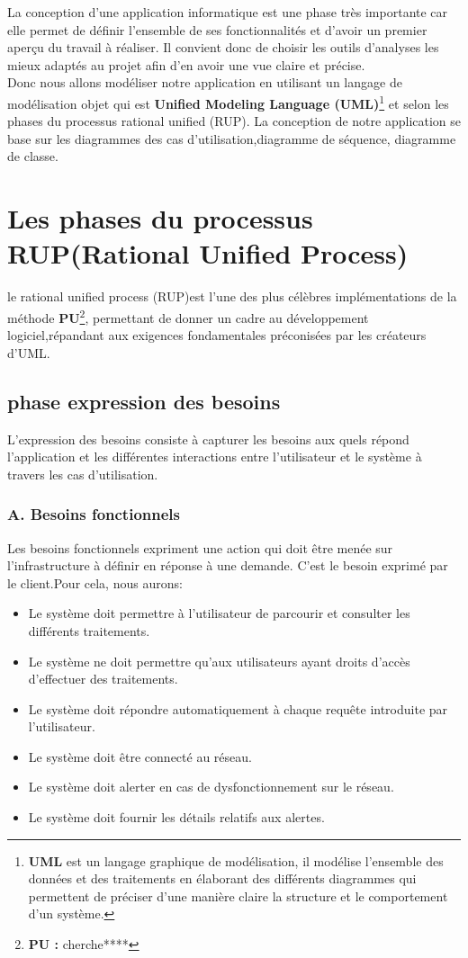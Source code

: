 
La conception d'une application informatique est une phase très importante car elle permet de définir l'ensemble de ses fonctionnalités et d'avoir un premier aperçu du travail à réaliser. Il convient donc de choisir les outils d'analyses les mieux adaptés au projet afin d'en avoir une vue claire et précise.\\
Donc  nous allons modéliser notre application en utilisant un langage de modélisation objet qui est \textbf{Unified Modeling Language (UML)}\footnote{\textbf{UML} est un langage graphique de modélisation, il modélise l'ensemble des données et des traitements en élaborant des différents diagrammes qui permettent de préciser d'une manière claire la structure et le comportement d'un système.} et selon les phases du processus rational unified (RUP).
La conception de notre application se base sur les diagrammes  des cas d'utilisation,diagramme de séquence, diagramme de classe.\\
\section{Les phases du processus RUP(Rational Unified Process)}
le rational unified process (RUP)est l'une des plus célèbres implémentations de la méthode \textbf{PU}\footnote{\textbf{PU :} cherche****}, permettant de donner un cadre au développement logiciel,répandant aux exigences fondamentales préconisées par les créateurs d'UML. 
\subsection{phase expression des besoins}
L'expression des besoins consiste à capturer les besoins aux quels  répond  l'application et les différentes interactions entre l'utilisateur et le système à travers les cas d'utilisation.

\subsubsection{A. Besoins fonctionnels}
Les besoins fonctionnels expriment une action qui doit être menée sur l'infrastructure à définir en réponse à une demande. C'est le besoin exprimé par le client.Pour cela, nous aurons:
\begin{itemize}
\item Le système doit  permettre  à l'utilisateur  de parcourir  et consulter les différents traitements. 
\item Le système ne doit permettre qu'aux utilisateurs ayant droits d'accès d'effectuer  des traitements.
\item Le système doit répondre automatiquement  à chaque requête introduite par  l'utilisateur.
\item Le système doit être connecté au réseau.
\item Le système doit alerter en cas de dysfonctionnement sur le réseau.
\item Le système doit fournir les détails relatifs aux alertes.

\end{itemize}
